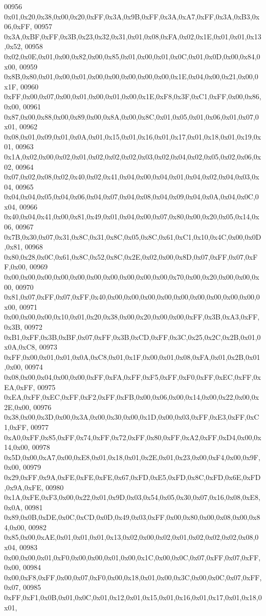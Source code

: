 \begin{DoxyCode}
00956 0x01,0x20,0x38,0x00,0x20,0xFF,0x3A,0x9B,0xFF,0x3A,0xA7,0xFF,0x3A,0xB3,0x06,0xFF,
00957 0x3A,0xBF,0xFF,0x3B,0x23,0x32,0x31,0x01,0x08,0xFA,0x02,0x1E,0x01,0x01,0x13,0x52,
00958 0x02,0x0E,0x01,0x00,0x82,0x00,0x85,0x01,0x00,0x01,0x0C,0x01,0x0D,0x00,0x84,0x00,
00959 0x8B,0x80,0x01,0x00,0x01,0x00,0x00,0x00,0x00,0x00,0x1E,0x04,0x00,0x21,0x00,0x1F,
00960 0xFF,0x00,0x07,0x00,0x01,0x00,0x01,0x00,0x1E,0xF8,0x3F,0xC1,0xFF,0x00,0x86,0x00,
00961 0x87,0x00,0x88,0x00,0x89,0x00,0x8A,0x00,0x8C,0x01,0x05,0x01,0x06,0x01,0x07,0x01,
00962 0x08,0x01,0x09,0x01,0x0A,0x01,0x15,0x01,0x16,0x01,0x17,0x01,0x18,0x01,0x19,0x01,
00963 0x1A,0x02,0x00,0x02,0x01,0x02,0x02,0x02,0x03,0x02,0x04,0x02,0x05,0x02,0x06,0x02,
00964 0x07,0x02,0x08,0x02,0x40,0x02,0x41,0x04,0x00,0x04,0x01,0x04,0x02,0x04,0x03,0x04,
00965 0x04,0x04,0x05,0x04,0x06,0x04,0x07,0x04,0x08,0x04,0x09,0x04,0x0A,0x04,0x0C,0x04,
00966 0x40,0x04,0x41,0x00,0x81,0x49,0x01,0x04,0x00,0x07,0x80,0x00,0x20,0x05,0x14,0x06,
00967 0x7B,0x30,0x07,0x31,0x8C,0x31,0x8C,0x05,0x8C,0x61,0xC1,0x10,0x4C,0x00,0x0D,0x81,
00968 0x80,0x28,0x0C,0x61,0x8C,0x52,0x8C,0x2E,0x02,0x00,0x8D,0x07,0xFF,0x07,0xFF,0x00,
00969 0x00,0x00,0x00,0x00,0x00,0x00,0x00,0x00,0x00,0x00,0x70,0x00,0x20,0x00,0x00,0x00,
00970 0x81,0x07,0xFF,0x07,0xFF,0x40,0x00,0x00,0x00,0x00,0x00,0x00,0x00,0x00,0x00,0x00,
00971 0x00,0x00,0x00,0x10,0x01,0x20,0x38,0x00,0x20,0x00,0x00,0xFF,0x3B,0xA3,0xFF,0x3B,
00972 0xB1,0xFF,0x3B,0xBF,0x07,0xFF,0x3B,0xCD,0xFF,0x3C,0x25,0x2C,0x2B,0x01,0x0A,0xC8,
00973 0xFF,0x00,0x01,0x01,0x0A,0xC8,0x01,0x1F,0x00,0x01,0x08,0xFA,0x01,0x2B,0x01,0x00,
00974 0x08,0x00,0x04,0x00,0x00,0xFF,0xFA,0xFF,0xF5,0xFF,0xF0,0xFF,0xEC,0xFF,0xEA,0xFF,
00975 0xEA,0xFF,0xEC,0xFF,0xF2,0xFF,0xFB,0x00,0x06,0x00,0x14,0x00,0x22,0x00,0x2E,0x00,
00976 0x38,0x00,0x3D,0x00,0x3A,0x00,0x30,0x00,0x1D,0x00,0x03,0xFF,0xE3,0xFF,0xC1,0xFF,
00977 0xA0,0xFF,0x85,0xFF,0x74,0xFF,0x72,0xFF,0x80,0xFF,0xA2,0xFF,0xD4,0x00,0x14,0x00,
00978 0x5D,0x00,0xA7,0x00,0xE8,0x01,0x18,0x01,0x2E,0x01,0x23,0x00,0xF4,0x00,0x9F,0x00,
00979 0x29,0xFF,0x9A,0xFE,0xFE,0xFE,0x67,0xFD,0xE5,0xFD,0x8C,0xFD,0x6E,0xFD,0x9A,0xFE,
00980 0x1A,0xFE,0xF3,0x00,0x22,0x01,0x9D,0x03,0x54,0x05,0x30,0x07,0x16,0x08,0xE8,0x0A,
00981 0x89,0x0B,0xDE,0x0C,0xCD,0x0D,0x49,0x03,0xFF,0x00,0x80,0x00,0x08,0x00,0x84,0x00,
00982 0x85,0x00,0xAE,0x01,0x01,0x01,0x13,0x02,0x00,0x02,0x01,0x02,0x02,0x02,0x08,0x04,
00983 0x00,0x00,0x01,0xF0,0x00,0x00,0x01,0x00,0x1C,0x00,0x0C,0x07,0xFF,0x07,0xFF,0x00,
00984 0x00,0xF8,0xFF,0x00,0x07,0xF0,0x00,0x18,0x01,0x00,0x3C,0x00,0x0C,0x07,0xFF,0x07,
00985 0xFF,0xF1,0x0B,0x01,0x0C,0x01,0x12,0x01,0x15,0x01,0x16,0x01,0x17,0x01,0x18,0x01,

\end{DoxyCode}
